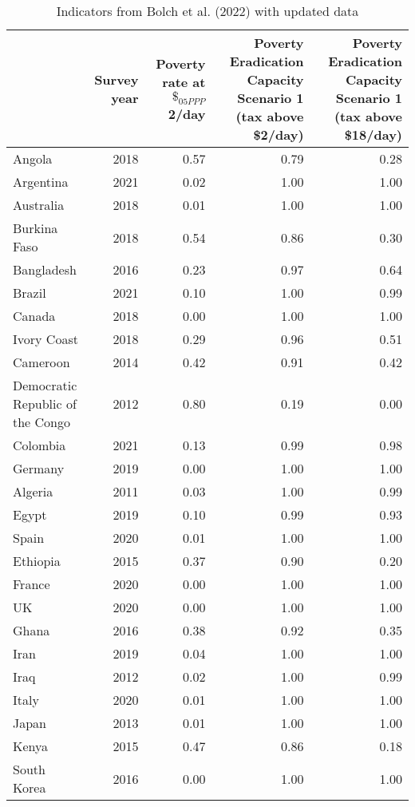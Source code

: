 
\begin{longtable}[t]{lrrrr}
\caption{\label{tab:bolch_update}Indicators from Bolch et al. (2022) with updated data}\\
\toprule
  & \makecell{Survey\\year} & \makecell{Poverty rate\\at $\$_{05PPP}$2}/day & \makecell{Poverty Eradication Capacity\\Scenario 1 (tax above \$2/day)} & \makecell{Poverty Eradication Capacity\\Scenario 1 (tax above \$18/day)}\\
\midrule
Angola & 2018 & 0.57 & 0.79 & 0.28\\
Argentina & 2021 & 0.02 & 1.00 & 1.00\\
Australia & 2018 & 0.01 & 1.00 & 1.00\\
Burkina Faso & 2018 & 0.54 & 0.86 & 0.30\\
Bangladesh & 2016 & 0.23 & 0.97 & 0.64\\
Brazil & 2021 & 0.10 & 1.00 & 0.99\\
Canada & 2018 & 0.00 & 1.00 & 1.00\\
Ivory Coast & 2018 & 0.29 & 0.96 & 0.51\\
Cameroon & 2014 & 0.42 & 0.91 & 0.42\\
Democratic Republic of the Congo & 2012 & 0.80 & 0.19 & 0.00\\
Colombia & 2021 & 0.13 & 0.99 & 0.98\\
Germany & 2019 & 0.00 & 1.00 & 1.00\\
Algeria & 2011 & 0.03 & 1.00 & 0.99\\
Egypt & 2019 & 0.10 & 0.99 & 0.93\\
Spain & 2020 & 0.01 & 1.00 & 1.00\\
Ethiopia & 2015 & 0.37 & 0.90 & 0.20\\
France & 2020 & 0.00 & 1.00 & 1.00\\
UK & 2020 & 0.00 & 1.00 & 1.00\\
Ghana & 2016 & 0.38 & 0.92 & 0.35\\
Iran & 2019 & 0.04 & 1.00 & 1.00\\
Iraq & 2012 & 0.02 & 1.00 & 0.99\\
Italy & 2020 & 0.01 & 1.00 & 1.00\\
Japan & 2013 & 0.01 & 1.00 & 1.00\\
Kenya & 2015 & 0.47 & 0.86 & 0.18\\
South Korea & 2016 & 0.00 & 1.00 & 1.00\\

\end{longtable}
